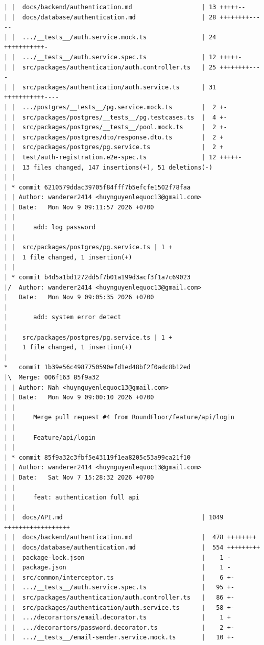 \documentclass[12pt]{article}
\begin{document}
\begin{lstlisting}[numbers=none,breaklines=true]
| |  docs/backend/authentication.md                   | 13 +++++--
| |  docs/database/authentication.md                  | 28 ++++++++-----
| |  .../__tests__/auth.service.mock.ts               | 24 +++++++++++-
| |  .../__tests__/auth.service.spec.ts               | 12 +++++-
| |  src/packages/authentication/auth.controller.ts   | 25 ++++++++----
| |  src/packages/authentication/auth.service.ts      | 31 +++++++++++----
| |  .../postgres/__tests__/pg.service.mock.ts        |  2 +-
| |  src/packages/postgres/__tests__/pg.testcases.ts  |  4 +-
| |  src/packages/postgres/__tests__/pool.mock.ts     |  2 +-
| |  src/packages/postgres/dto/response.dto.ts        |  2 +
| |  src/packages/postgres/pg.service.ts              |  2 +
| |  test/auth-registration.e2e-spec.ts               | 12 +++++-
| |  13 files changed, 147 insertions(+), 51 deletions(-)
| |
| * commit 6210579ddac39705f84fff7b5efcfe1502f78faa
| | Author: wanderer2414 <huynguyenlequoc13@gmail.com>
| | Date:   Mon Nov 9 09:11:57 2026 +0700
| |
| |     add: log password
| |
| |  src/packages/postgres/pg.service.ts | 1 +
| |  1 file changed, 1 insertion(+)
| |
| * commit b4d5a1bd1272dd5f7b01a199d3acf3f1a7c69023
|/  Author: wanderer2414 <huynguyenlequoc13@gmail.com>
|   Date:   Mon Nov 9 09:05:35 2026 +0700
|
|       add: system error detect
|
|    src/packages/postgres/pg.service.ts | 1 +
|    1 file changed, 1 insertion(+)
|
*   commit 1b39e56c4987750590efd1ed48bf2f0adc8b12ed
|\  Merge: 006f163 85f9a32
| | Author: Nah <huynguyenlequoc13@gmail.com>
| | Date:   Mon Nov 9 09:00:10 2026 +0700
| |
| |     Merge pull request #4 from RoundFloor/feature/api/login
| |
| |     Feature/api/login
| |
| * commit 85f9a32c3fbf5e43119f1ea8205c53a99ca21f10
| | Author: wanderer2414 <huynguyenlequoc13@gmail.com>
| | Date:   Sat Nov 7 15:28:32 2026 +0700
| |
| |     feat: authentication full api
| |
| |  docs/API.md                                      | 1049 ++++++++++++++++++
| |  docs/backend/authentication.md                   |  478 ++++++++
| |  docs/database/authentication.md                  |  554 +++++++++
| |  package-lock.json                                |    1 -
| |  package.json                                     |    1 -
| |  src/common/interceptor.ts                        |    6 +-
| |  .../__tests__/auth.service.spec.ts               |   95 +-
| |  src/packages/authentication/auth.controller.ts   |   86 +-
| |  src/packages/authentication/auth.service.ts      |   58 +-
| |  .../decorartors/email.decorator.ts               |    1 +
| |  .../decorartors/password.decorator.ts            |    2 +-
| |  .../__tests__/email-sender.service.mock.ts       |   10 +-

\end{lstlisting}
\end{document}
